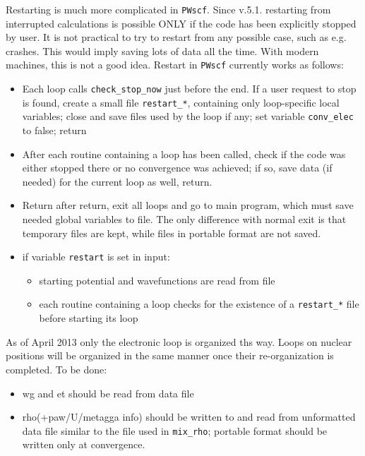 \documentclass[12pt,a4paper]{article}
\begin{document}
Restarting is much more complicated in  \texttt{PWscf}. Since v.5.1.
restarting from interrupted calculations is possible ONLY if the code
has been explicitly stopped by user. It is not practical to try to
restart from any possible case, such as e.g. crashes. This would
imply saving lots of data all the time. With modern machines, this is
not a good idea. Restart in  \texttt{PWscf} currently works as follows:
\begin{itemize}
\item Each loop calls \texttt{check\_stop\_now} just before the end.
  If a user request to stop is found, create a small file
  \texttt{restart\_*}, containing only loop-specific local variables;
  close and save files used by the loop if any; set variable
  \texttt{conv\_elec} to false; return
\item After each routine containing a loop has been called, check if the code
  was either stopped there or no convergence was achieved; if so, save
  data (if needed) for the current loop as well, return.
\item Return after return, exit all loops and go to main program, which must save
  needed global variables to file. The only difference with normal exit is that
  temporary files are kept, while files in portable format are not saved.
\item if variable \texttt{restart} is set in input:
  \begin{itemize}
  \item starting potential and wavefunctions are read from file
  \item each routine containing a loop checks for the existence of a
    \texttt{restart\_*} file before starting its loop
  \end{itemize}
\end{itemize}
As of April 2013 only the electronic loop is organized ths way. Loops
on nuclear positions will be organized in the same manner once their
re-organization is completed. To be done:
\begin{itemize}
\item wg and et should be read from data file
\item rho(+paw/U/metagga info) should be written to and read from
  unformatted data file similar to the file used in \texttt{mix\_rho};
  portable format should be written only at convergence.
\end{itemize}


\end{document}
